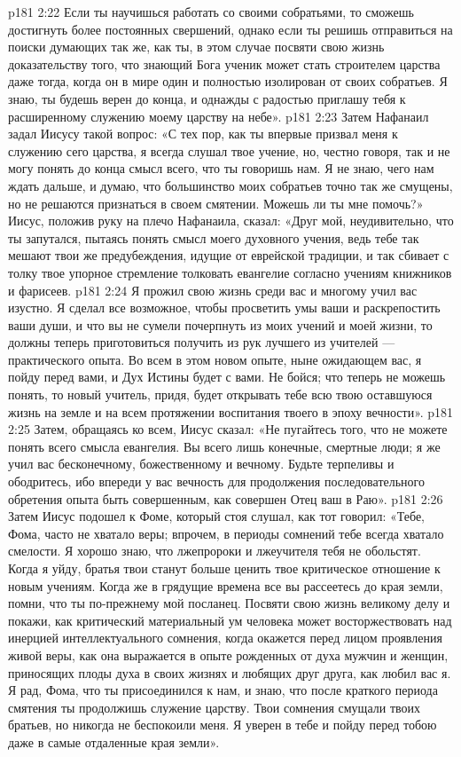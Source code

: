 \vs p181 2:22 Если ты научишься работать со своими собратьями, то сможешь достигнуть более постоянных свершений, однако если ты решишь отправиться на поиски думающих так же, как ты, в этом случае посвяти свою жизнь доказательству того, что знающий Бога ученик может стать строителем царства даже тогда, когда он в мире один и полностью изолирован от своих собратьев. Я знаю, ты будешь верен до конца, и однажды с радостью приглашу тебя к расширенному служению моему царству на небе».
\vs p181 2:23 Затем Нафанаил задал Иисусу такой вопрос: «С тех пор, как ты впервые призвал меня к служению сего царства, я всегда слушал твое учение, но, честно говоря, так и не могу понять до конца смысл всего, что ты говоришь нам. Я не знаю, чего нам ждать дальше, и думаю, что большинство моих собратьев точно так же смущены, но не решаются признаться в своем смятении. Можешь ли ты мне помочь?» Иисус, положив руку на плечо Нафанаила, сказал: «Друг мой, неудивительно, что ты запутался, пытаясь понять смысл моего духовного учения, ведь тебе так мешают твои же предубеждения, идущие от еврейской традиции, и так сбивает с толку твое упорное стремление толковать евангелие согласно учениям книжников и фарисеев.
\vs p181 2:24 Я прожил свою жизнь среди вас и многому учил вас изустно. Я сделал все возможное, чтобы просветить умы ваши и раскрепостить ваши души, и что вы не сумели почерпнуть из моих учений и моей жизни, то должны теперь приготовиться получить из рук лучшего из учителей --- практического опыта. Во всем в этом новом опыте, ныне ожидающем вас, я пойду перед вами, и Дух Истины будет с вами. Не бойся; что теперь не можешь понять, то новый учитель, придя, будет открывать тебе всю твою оставшуюся жизнь на земле и на всем протяжении воспитания твоего в эпоху вечности».
\vs p181 2:25 Затем, обращаясь ко всем, Иисус сказал: «Не пугайтесь того, что не можете понять всего смысла евангелия. Вы всего лишь конечные, смертные люди; я же учил вас бесконечному, божественному и вечному. Будьте терпеливы и ободритесь, ибо впереди у вас вечность для продолжения последовательного обретения опыта быть совершенным, как совершен Отец ваш в Раю».
\vs p181 2:26 \pc Затем Иисус подошел к Фоме, который стоя слушал, как тот говорил: «Тебе, Фома, часто не хватало веры; впрочем, в периоды сомнений тебе всегда хватало смелости. Я хорошо знаю, что лжепророки и лжеучителя тебя не обольстят. Когда я уйду, братья твои станут больше ценить твое критическое отношение к новым учениям. Когда же в грядущие времена все вы рассеетесь до края земли, помни, что ты по\hyp{}прежнему мой посланец. Посвяти свою жизнь великому делу и покажи, как критический материальный ум человека может восторжествовать над инерцией интеллектуального сомнения, когда окажется перед лицом проявления живой веры, как она выражается в опыте рожденных от духа мужчин и женщин, приносящих плоды духа в своих жизнях и любящих друг друга, как любил вас я. Я рад, Фома, что ты присоединился к нам, и знаю, что после краткого периода смятения ты продолжишь служение царству. Твои сомнения смущали твоих братьев, но никогда не беспокоили меня. Я уверен в тебе и пойду перед тобою даже в самые отдаленные края земли».
